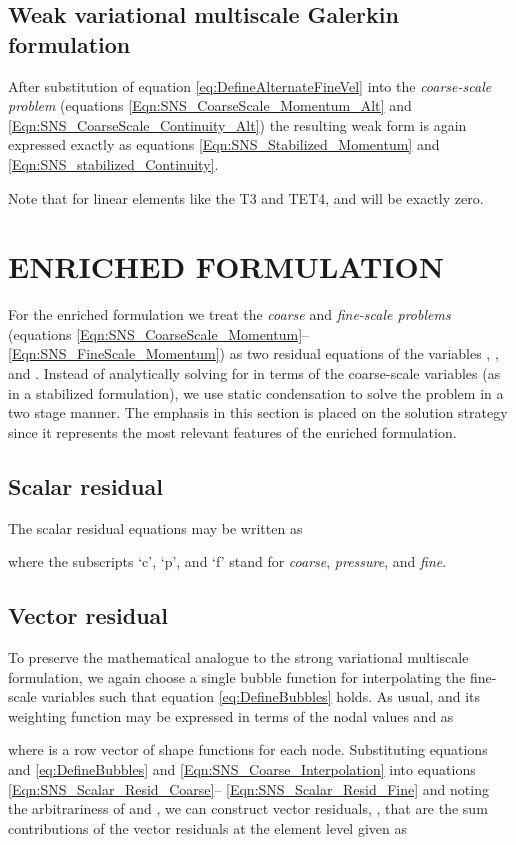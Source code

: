 \documentclass[11pt]{amsart}
\begin{document}
\subsection{Weak variational multiscale Galerkin formulation}
After substitution of equation \eqref{eq:DefineAlternateFineVel} into the \emph{coarse-scale problem} (equations \eqref{Eqn:SNS_CoarseScale_Momentum_Alt} and \eqref{Eqn:SNS_CoarseScale_Continuity_Alt})
the resulting weak form is again expressed exactly as equations \eqref{Eqn:SNS_Stabilized_Momentum} and \eqref{Eqn:SNS_stabilized_Continuity}.

Note that for linear elements like the T3 and TET4,  and  will be exactly zero.
%
 \section{ENRICHED FORMULATION}
For the enriched formulation we treat the \emph{coarse} and \emph{fine-scale problems} (equations \eqref{Eqn:SNS_CoarseScale_Momentum}-- \eqref{Eqn:SNS_FineScale_Momentum}) as two residual equations of the variables , , and . Instead of analytically solving for  in terms of the coarse-scale variables (as in a stabilized formulation), we use static condensation to solve the problem in a two stage manner.  The emphasis in this section is placed on the solution strategy since it represents the most relevant features of the enriched formulation.  
\subsection{Scalar residual}
The scalar residual equations may be written as

where the subscripts `c', `p', and `f' stand for \emph{coarse}, \emph{pressure}, and \emph{fine}.
\subsection{Vector residual}
To preserve the mathematical analogue to the strong variational multiscale formulation, we again choose a single bubble function for interpolating the fine-scale variables such that equation \eqref{eq:DefineBubbles} holds.  As usual,  and its weighting function  may be expressed in terms of the nodal values  and  as

where  is a row vector of shape functions for each node.
Substituting equations and \eqref{eq:DefineBubbles} and \eqref{Eqn:SNS_Coarse_Interpolation} into equations \eqref{Eqn:SNS_Scalar_Resid_Coarse}-- \eqref{Eqn:SNS_Scalar_Resid_Fine} and noting the arbitrariness of  and , we can construct vector residuals, , that are the sum contributions of the vector residuals at the element level given as
\end{document}
